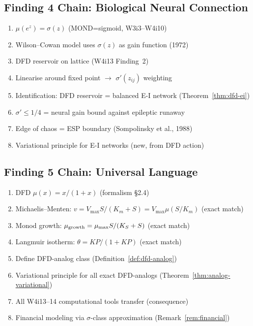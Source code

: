 \documentclass[11pt]{article}
\theoremstyle{definition}
\theoremstyle{remark}
\begin{document}
\subsection{Finding 4 Chain: Biological Neural Connection}

\begin{enumerate}[nosep]
\item $\mu(e^z) = \sigma(z)$ (MOND=sigmoid, W3i3--W4i10)
\item Wilson--Cowan model uses $\sigma(z)$ as gain function (1972)
\item DFD reservoir on lattice (W4i13 Finding~2)
\item Linearise around fixed point $\to$ $\sigma'(z_{ij})$ weighting
\item Identification: DFD reservoir = balanced E-I network (Theorem~\ref{thm:dfd-ei})
\item $\sigma' \leq 1/4$ = neural gain bound against epileptic runaway
\item Edge of chaos = ESP boundary (Sompolinsky et al., 1988)
\item Variational principle for E-I networks (new, from DFD action)
\end{enumerate}

\subsection{Finding 5 Chain: Universal Language}

\begin{enumerate}[nosep]
\item DFD $\mu(x) = x/(1+x)$ (formalism \S2.4)
\item Michaelis--Menten: $v = V_{\max}S/(K_m + S) = V_{\max}\mu(S/K_m)$ (exact match)
\item Monod growth: $\mu_{\rm growth} = \mu_{\max}S/(K_S + S)$ (exact match)
\item Langmuir isotherm: $\theta = KP/(1+KP)$ (exact match)
\item Define DFD-analog class (Definition~\ref{def:dfd-analog})
\item Variational principle for all exact DFD-analogs (Theorem~\ref{thm:analog-variational})
\item All W4i13--14 computational tools transfer (consequence)
\item Financial modeling via $\sigma$-class approximation (Remark~\ref{rem:financial})
\end{enumerate}

\end{document}
